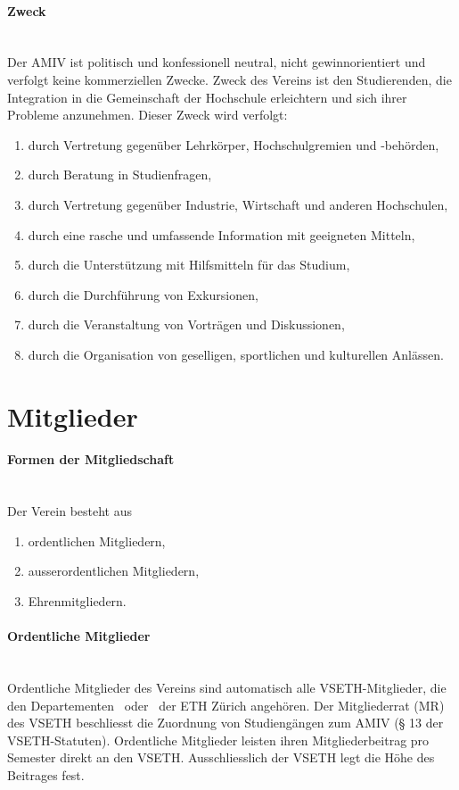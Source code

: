 \documentclass[a4paper,11pt]{article}
\begin{document}
\paragraph{Zweck}\label{Zweck} \ \\
Der AMIV ist politisch und konfessionell neutral, nicht gewinnorientiert und verfolgt keine kommerziellen Zwecke. Zweck des Vereins ist den Studierenden, die Integration in die Gemeinschaft der Hochschule erleichtern und sich ihrer Probleme anzunehmen.
Dieser Zweck wird verfolgt:
\begin{enumerate}
  \item durch Vertretung gegenüber Lehrkörper, Hochschulgremien und -behörden,\label{HoPo}
  \item durch Beratung in Studienfragen,\label{Beratung}
  \item durch Vertretung gegenüber Industrie, Wirtschaft und anderen Hochschulen,\label{ER}
  \item durch eine rasche und umfassende Information mit geeigneten Mitteln,\label{PR}
  \item durch die Unterstützung mit Hilfsmitteln für das Studium,\label{Fileserver}
  \item durch die Durchführung von Exkursionen,\label{Exkursionen}
  \item durch die Veranstaltung von Vorträgen und Diskussionen,\label{Vortraege}
  \item durch die Organisation von geselligen, sportlichen und kulturellen Anlässen.\label{Kultur}
\end{enumerate}


\section{Mitglieder} 
\paragraph{Formen der Mitgliedschaft} \label{Mitglieder} \ \\
Der Verein besteht aus
\begin{enumerate}
  \item ordentlichen Mitgliedern,
  \item ausserordentlichen Mitgliedern,
  \item Ehrenmitgliedern.
\end{enumerate}


\paragraph{Ordentliche Mitglieder} \ \\
Ordentliche Mitglieder des Vereins sind automatisch alle VSETH-Mitglieder, die den Departementen \MAVT\ oder \ITET\ der ETH Zürich angehören. Der Mitgliederrat (MR) des VSETH beschliesst die Zuordnung von Studiengängen zum AMIV (§ 13 der VSETH-Statuten).
Ordentliche Mitglieder leisten ihren Mitgliederbeitrag pro Semester direkt an den VSETH. Ausschliesslich der VSETH legt die Höhe des Beitrages fest.
\end{document}
